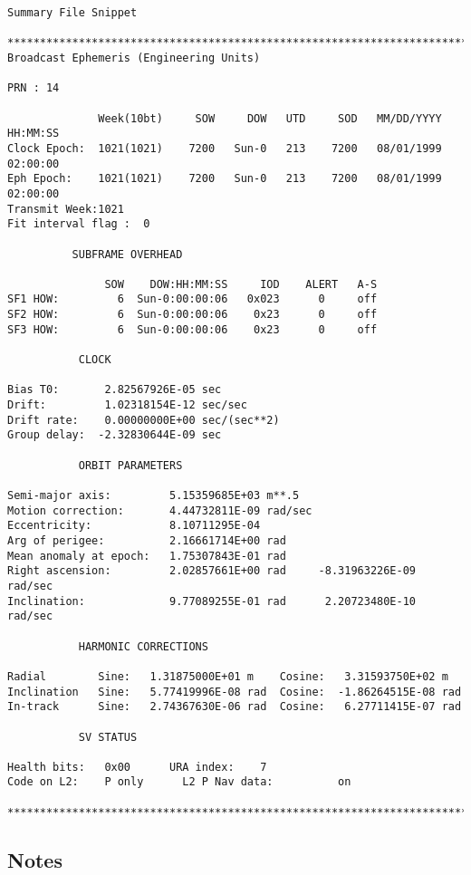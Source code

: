 \begin{\outputsize}
\begin{verbatim}
Summary File Snippet

****************************************************************************
Broadcast Ephemeris (Engineering Units)

PRN : 14

              Week(10bt)     SOW     DOW   UTD     SOD   MM/DD/YYYY   HH:MM:SS
Clock Epoch:  1021(1021)    7200   Sun-0   213    7200   08/01/1999   02:00:00
Eph Epoch:    1021(1021)    7200   Sun-0   213    7200   08/01/1999   02:00:00
Transmit Week:1021
Fit interval flag :  0

          SUBFRAME OVERHEAD

               SOW    DOW:HH:MM:SS     IOD    ALERT   A-S
SF1 HOW:         6  Sun-0:00:00:06   0x023      0     off
SF2 HOW:         6  Sun-0:00:00:06    0x23      0     off
SF3 HOW:         6  Sun-0:00:00:06    0x23      0     off

           CLOCK

Bias T0:       2.82567926E-05 sec
Drift:         1.02318154E-12 sec/sec
Drift rate:    0.00000000E+00 sec/(sec**2)
Group delay:  -2.32830644E-09 sec

           ORBIT PARAMETERS

Semi-major axis:         5.15359685E+03 m**.5
Motion correction:       4.44732811E-09 rad/sec
Eccentricity:            8.10711295E-04
Arg of perigee:          2.16661714E+00 rad
Mean anomaly at epoch:   1.75307843E-01 rad
Right ascension:         2.02857661E+00 rad     -8.31963226E-09 rad/sec
Inclination:             9.77089255E-01 rad      2.20723480E-10 rad/sec

           HARMONIC CORRECTIONS

Radial        Sine:   1.31875000E+01 m    Cosine:   3.31593750E+02 m
Inclination   Sine:   5.77419996E-08 rad  Cosine:  -1.86264515E-08 rad
In-track      Sine:   2.74367630E-06 rad  Cosine:   6.27711415E-07 rad

           SV STATUS

Health bits:   0x00      URA index:    7
Code on L2:    P only      L2 P Nav data:          on

****************************************************************************
\end{verbatim}
\end{\outputsize}
\subsection{Notes}

%
